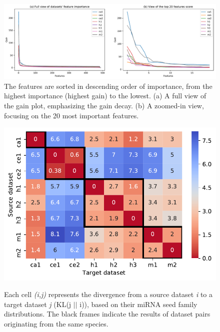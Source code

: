 \documentclass{bmcart}
\begin{document}
\begin{backmatter}
\begin{figure}[h!]
    \centering
     \caption{}
      \includegraphics[width=\textwidth]{3_feature_importance.pdf}
      \caption*{The features are sorted in descending order of importance, from the highest importance (highest gain) to the lowest. (a) A full view of the gain plot, emphasizing the gain decay.  (b) A zoomed-in view, focusing on the 20 most important features.}%
    \label{fig:feature_importance}%
\end{figure}

\begin{figure}[h!]
  \caption{}
      \includegraphics[width=\textwidth]{4_divergence_reverse.pdf}
      \label{fig:divergence}
      \caption*{Each cell \textit{(i,j)} represents the divergence from  a source dataset \textit{i} to a target dataset \textit{j} (KL(j $||$ i)), based on their miRNA seed family distributions. The black frames indicate the results of dataset pairs originating from the same species.}
      \end{figure}


\end{backmatter}
\end{document}
